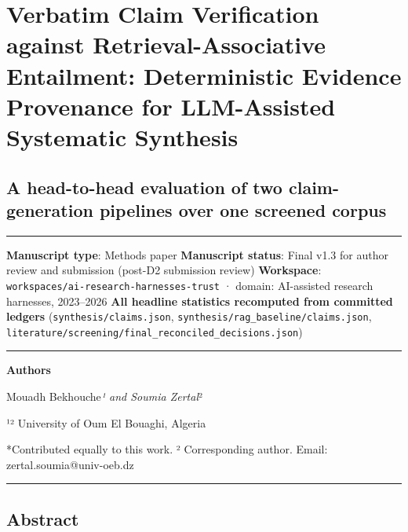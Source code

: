 \documentclass[11pt]{article}
\begin{document}
\section{Verbatim Claim Verification against Retrieval-Associative
Entailment: Deterministic Evidence Provenance for LLM-Assisted
Systematic
Synthesis}\label{verbatim-claim-verification-against-retrieval-associative-entailment-deterministic-evidence-provenance-for-llm-assisted-systematic-synthesis}

\subsection{A head-to-head evaluation of two claim-generation pipelines
over one screened
corpus}\label{a-head-to-head-evaluation-of-two-claim-generation-pipelines-over-one-screened-corpus}

\begin{center}\rule{0.5\linewidth}{0.5pt}\end{center}

\textbf{Manuscript type}: Methods paper \textbf{Manuscript status}:
Final v1.3 for author review and submission (post-D2 submission review)
\textbf{Workspace}: \texttt{workspaces/ai-research-harnesses-trust} ·
domain: AI-assisted research harnesses, 2023--2026 \textbf{All headline
statistics recomputed from committed ledgers}
(\texttt{synthesis/claims.json},
\texttt{synthesis/rag\_baseline/claims.json},
\texttt{literature/screening/final\_reconciled\_decisions.json})

\begin{center}\rule{0.5\linewidth}{0.5pt}\end{center}

\textbf{Authors}

Mouadh Bekhouche\emph{¹ and Soumia Zertal}²

¹² University of Oum El Bouaghi, Algeria

*Contributed equally to this work. ² Corresponding author. Email:
zertal.soumia@univ-oeb.dz

\begin{center}\rule{0.5\linewidth}{0.5pt}\end{center}

\subsection{Abstract}\label{abstract}
\end{document}
